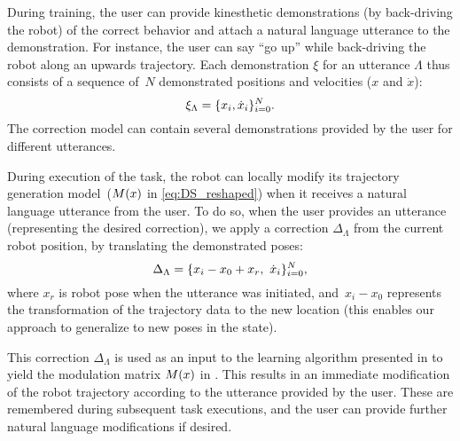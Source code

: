 
During training, the user can provide kinesthetic demonstrations (by back-driving the robot) of the correct behavior and attach a natural language utterance to the demonstration.
For instance, the user can say ``go up'' while back-driving the robot along an upwards trajectory.
Each demonstration $\xi$ for an utterance $\Lambda$ thus consists of a sequence of~$N$ demonstrated positions and velocities ($x$ and $\dot{x}$):
\begin{equation}
  \xi_\Lambda = \{ x_i, \dot{x}_i \}_{i=0}^N.
\end{equation}
The correction model can contain several demonstrations provided by the user for different utterances.



During execution of the task, the robot can locally modify its trajectory generation model~($M\lparen x\rparen$ in \cref{eq:DS_reshaped}) when it receives a natural language utterance from the user.
To do so, when the user provides an utterance (representing the desired correction), we apply a correction $\Delta_\Lambda$ from the current robot position, by translating the demonstrated poses:
\begin{equation}
  \Delta_\Lambda = \{ x_i - x_0  + x_r, \,\, \dot{x}_i \}_{i=0}^N,
\end{equation}
where $x_r$ is robot pose when the utterance was initiated,
and~$x_i-x_0$ represents the transformation of the trajectory data to the new location (this enables our approach to generalize to new poses in the state).

This correction $\Delta_\Lambda$ is used as an input to the learning algorithm presented in \citet{Kronander2015} to yield the modulation matrix $M\lparen x\rparen$ in .
This results in an immediate modification of the robot trajectory according to the utterance provided by the user.
These are remembered during subsequent task executions, and the user can provide further natural language modifications if desired.
